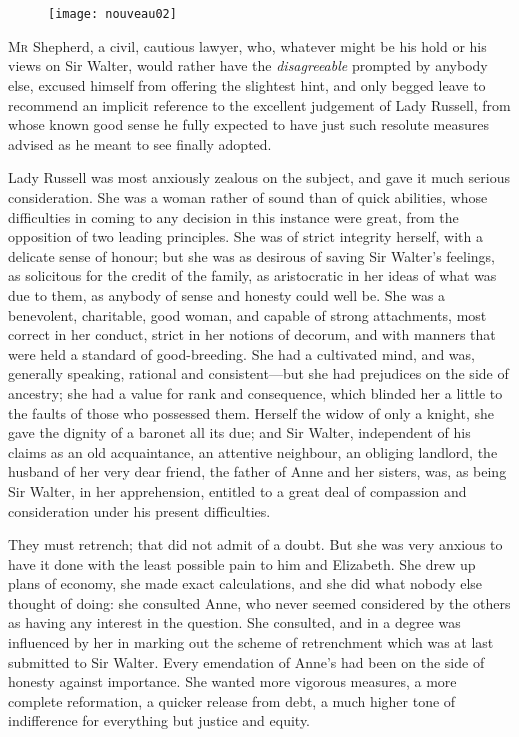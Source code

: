 \chapter[Chapter \thechapter]{}

\begin{figure}[t!]
\centering
\texttt{[image: nouveau02]}
\end{figure}

\lettrine[lraise=0.3]{M}{r} Shepherd, a civil, cautious lawyer, who, whatever might be his hold or his views on Sir Walter, would rather have the \textit{disagreeable} prompted by anybody else, excused himself from offering the slightest hint, and only begged leave to recommend an implicit reference to the excellent judgement of Lady Russell, from whose known good sense he fully expected to have just such resolute measures advised as he meant to see finally adopted.

Lady Russell was most anxiously zealous on the subject, and gave it much serious consideration. She was a woman rather of sound than of quick abilities, whose difficulties in coming to any decision in this instance were great, from the opposition of two leading principles. She was of strict integrity herself, with a delicate sense of honour; but she was as desirous of saving Sir Walter's feelings, as solicitous for the credit of the family, as aristocratic in her ideas of what was due to them, as anybody of sense and honesty could well be. She was a benevolent, charitable, good woman, and capable of strong attachments, most correct in her conduct, strict in her notions of decorum, and with manners that were held a standard of good-breeding. She had a cultivated mind, and was, generally speaking, rational and consistent—but she had prejudices on the side of ancestry; she had a value for rank and consequence, which blinded her a little to the faults of those who possessed them. Herself the widow of only a knight, she gave the dignity of a baronet all its due; and Sir Walter, independent of his claims as an old acquaintance, an attentive neighbour, an obliging landlord, the husband of her very dear friend, the father of Anne and her sisters, was, as being Sir Walter, in her apprehension, entitled to a great deal of compassion and consideration under his present difficulties.

They must retrench; that did not admit of a doubt. But she was very anxious to have it done with the least possible pain to him and Elizabeth. She drew up plans of economy, she made exact calculations, and she did what nobody else thought of doing: she consulted Anne, who never seemed considered by the others as having any interest in the question. She consulted, and in a degree was influenced by her in marking out the scheme of retrenchment which was at last submitted to Sir Walter. Every emendation of Anne's had been on the side of honesty against importance. She wanted more vigorous measures, a more complete reformation, a quicker release from debt, a much higher tone of indifference for everything but justice and equity.


